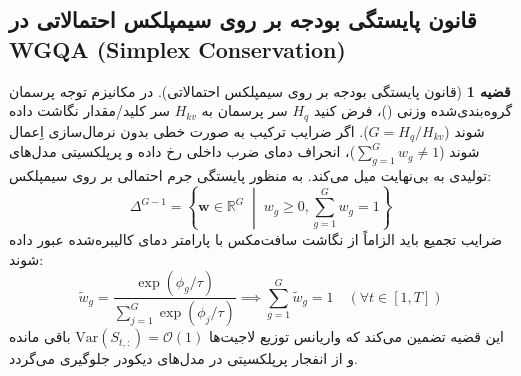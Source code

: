 \documentclass[12pt,a4paper]{report}
\theoremstyle{definition}
\newtheorem{theorem}{قضیه}[chapter]
\begin{document}
\subsection{قانون پایستگی بودجه بر روی سیمپلکس احتمالاتی در WGQA (Simplex Conservation)}
\begin{theorem}[قانون پایستگی بودجه بر روی سیمپلکس احتمالاتی]
\label{thm:simplex_conservation}
در مکانیزم توجه پرسمان گروه‌بندی‌شده وزنی ()، فرض کنید $H_q$ سر پرسمان به $H_{kv}$ سر کلید/مقدار نگاشت داده شوند ($G = H_q / H_{kv}$). اگر ضرایب ترکیب به صورت خطی بدون نرمال‌سازی اِعمال شوند ($\sum_{g=1}^G w_g \ne 1$)، انحراف دمای ضرب داخلی رخ داده و پرپلکسیتی مدل‌های تولیدی به بی‌نهایت میل می‌کند. به منظور پایستگی جرم احتمالی بر روی سیمپلکس:
\begin{equation}
\Delta^{G-1} = \left\{ \mathbf{w} \in \mathbb{R}^G \;\middle|\; w_g \ge 0, \sum_{g=1}^G w_g = 1 \right\}
\end{equation}
ضرایب تجمیع باید الزاماً از نگاشت سافت‌مکس با پارامتر دمای کالیبره‌شده عبور داده شوند:
\begin{equation}
\tilde{w}_g = \frac{\exp(\phi_g / \tau)}{\sum_{j=1}^G \exp(\phi_j / \tau)} \implies \sum_{g=1}^G \tilde{w}_g = 1 \quad (\forall t \in [1, T])
\end{equation}
این قضیه تضمین می‌کند که واریانس توزیع لاجیت‌ها $\text{Var}(S_{t, :}) = \mathcal{O}(1)$ باقی مانده و از انفجار پرپلکسیتی در مدل‌های دیکودر جلوگیری می‌گردد.
\end{theorem}
\end{document}
